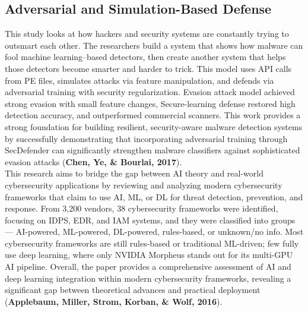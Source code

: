 \subsection{Adversarial and Simulation-Based Defense}
This study looks at how hackers and security systems are constantly trying to outsmart each other. The researchers build a system that shows how malware can fool machine learning–based detectors, then create another system that helps those detectors become smarter and harder to trick. This model uses API calls from PE files, simulates attacks via feature manipulation, and defends via adversarial training with security regularization. Evasion attack model achieved strong evasion with small feature changes, Secure-learning defense restored high detection accuracy, and outperformed commercial scanners. This work provides a strong foundation for building resilient, security-aware malware detection systems by successfully demonstrating that incorporating adversarial training through SecDefender can significantly strengthen malware classifiers against sophisticated evasion attacks (\textbf{Chen, Ye, \& Bourlai, 2017})\cite{Chen}.\\

This research aims to bridge the gap between AI theory and real-world cybersecurity applications by reviewing and analyzing modern cybersecurity frameworks that claim to use AI, ML, or DL for threat detection, prevention, and response. From 3,200 vendors, 38 cybersecurity frameworks were identified, focusing on IDPS, EDR, and IAM systems, and they were classified into groups — AI-powered, ML-powered, DL-powered, rules-based, or unknown/no info. Most cybersecurity frameworks are still rules-based or traditional ML-driven; few fully use deep learning, where only NVIDIA Morpheus stands out for its multi-GPU AI pipeline. Overall, the paper provides a comprehensive assessment of AI and deep learning integration within modern cybersecurity frameworks, revealing a significant gap between theoretical advances and practical deployment (\textbf{Applebaum, Miller, Strom, Korban, \& Wolf, 2016})\cite{Applebaum}.\\

